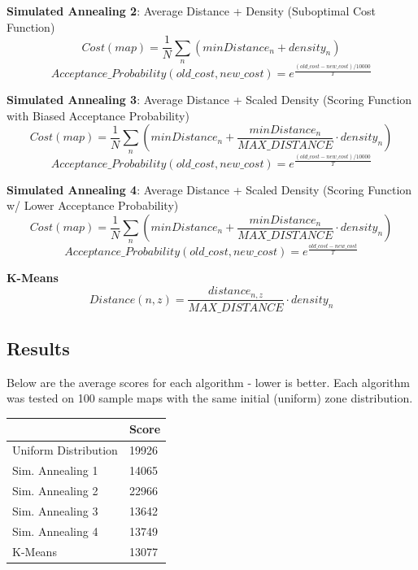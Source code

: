 \documentclass[11pt]{article}
\begin{document}
\noindent\textbf{Simulated Annealing 2}: Average Distance + Density (Suboptimal Cost Function)
$$Cost(map) = \frac{1}{N}\sum_n \left(minDistance_n + density_n\right)$$
$$Acceptance\_Probability(old\_cost, new\_cost) = e^{\frac{(old\_cost - new\_cost)/10000}{T}}$$
\newline

\noindent\textbf{Simulated Annealing 3}: Average Distance + Scaled Density (Scoring Function with Biased Acceptance Probability)
$$Cost(map) = \frac{1}{N}\sum_n \left(minDistance_n + \frac{minDistance_n}{MAX\_DISTANCE} \cdot density_n \right)$$
$$Acceptance\_Probability(old\_cost, new\_cost) = e^{\frac{(old\_cost - new\_cost)/10000}{T}}$$
\newline

\noindent\textbf{Simulated Annealing 4}: Average Distance + Scaled Density (Scoring Function w/ Lower Acceptance Probability)
\newline\newline
$$Cost(map) = \frac{1}{N}\sum_n \left(minDistance_n + \frac{minDistance_n}{MAX\_DISTANCE} \cdot density_n \right)$$
$$Acceptance\_Probability(old\_cost, new\_cost) = e^{\frac{old\_cost - new\_cost}{T}}$$
\newline\newline

\noindent\textbf{K-Means}
\newline\newline
\noindent 
$$Distance(n, z) = \frac{distance_{n,z}}{MAX\_DISTANCE} \cdot density_n$$
\newline

\noindent 

\subsection{Results}

Below are the average scores for each algorithm - lower is better. Each algorithm was tested on 100 sample maps with the same initial (uniform) zone distribution.

\begin{center}
  \begin{tabular}{ll}
    \toprule
    & Score \\
    \midrule
    Uniform Distribution & 19926\\
    Sim. Annealing 1 & 14065\\
    Sim. Annealing 2 & 22966\\
    Sim. Annealing 3 & 13642\\
    Sim. Annealing 4 & 13749\\
    K-Means & 13077\\
    \bottomrule
  \end{tabular}
\end{center}
\end{document}
